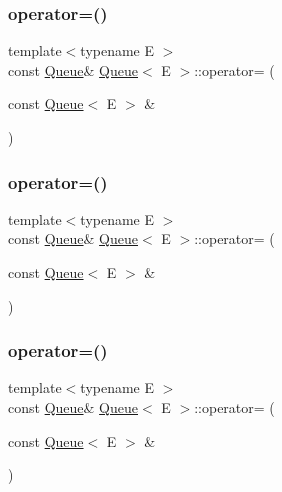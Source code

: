 \mbox{\label{class_queue_adf6f3eb046365f1b67b6c0bd5da2da59}} 
\subsubsection{\texorpdfstring{operator=()}{operator=()}\hspace{0.1cm}{\footnotesize\ttfamily [1/3]}}
{\footnotesize\ttfamily template$<$typename E $>$ \\
const \mbox{\hyperlink{class_queue}{Queue}}\& \mbox{\hyperlink{class_queue}{Queue}}$<$ E $>$\+::operator= (\begin{DoxyParamCaption}\item[{const \mbox{\hyperlink{class_queue}{Queue}}$<$ E $>$ \&}]{ }\end{DoxyParamCaption})\hspace{0.3cm}{\ttfamily [private]}}

\mbox{\label{class_queue_adf6f3eb046365f1b67b6c0bd5da2da59}} 
\subsubsection{\texorpdfstring{operator=()}{operator=()}\hspace{0.1cm}{\footnotesize\ttfamily [2/3]}}
{\footnotesize\ttfamily template$<$typename E $>$ \\
const \mbox{\hyperlink{class_queue}{Queue}}\& \mbox{\hyperlink{class_queue}{Queue}}$<$ E $>$\+::operator= (\begin{DoxyParamCaption}\item[{const \mbox{\hyperlink{class_queue}{Queue}}$<$ E $>$ \&}]{ }\end{DoxyParamCaption})\hspace{0.3cm}{\ttfamily [private]}}

\mbox{\label{class_queue_adf6f3eb046365f1b67b6c0bd5da2da59}} 
\subsubsection{\texorpdfstring{operator=()}{operator=()}\hspace{0.1cm}{\footnotesize\ttfamily [3/3]}}
{\footnotesize\ttfamily template$<$typename E $>$ \\
const \mbox{\hyperlink{class_queue}{Queue}}\& \mbox{\hyperlink{class_queue}{Queue}}$<$ E $>$\+::operator= (\begin{DoxyParamCaption}\item[{const \mbox{\hyperlink{class_queue}{Queue}}$<$ E $>$ \&}]{ }\end{DoxyParamCaption})\hspace{0.3cm}{\ttfamily [private]}}

